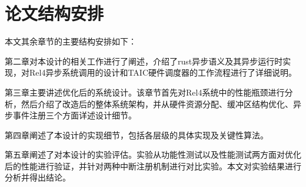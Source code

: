 \section{论文结构安排}

本文其余章节的主要结构安排如下：

第二章对本设计的相关工作进行了阐述，介绍了rust异步语义及其异步运行时实现，对Rel4异步系统调用的设计和TAIC硬件调度器的工作流程进行了详细说明。

第三章主要讲述优化后的系统设计。该章节首先对Rel4系统中的性能瓶颈进行分析，然后介绍了改造后的整体系统架构，并从硬件资源分配、缓冲区结构优化、异步事件注册三个方面详述设计细节。

第四章阐述了本设计的实现细节，包括各层级的具体实现及关键性算法。

第五章阐述了对本设计的实验评估。实验从功能性测试以及性能测试两方面对优化后的性能进行验证，并针对两种中断注册机制进行对比实验。本文对实验结果进行分析并得出结论。

